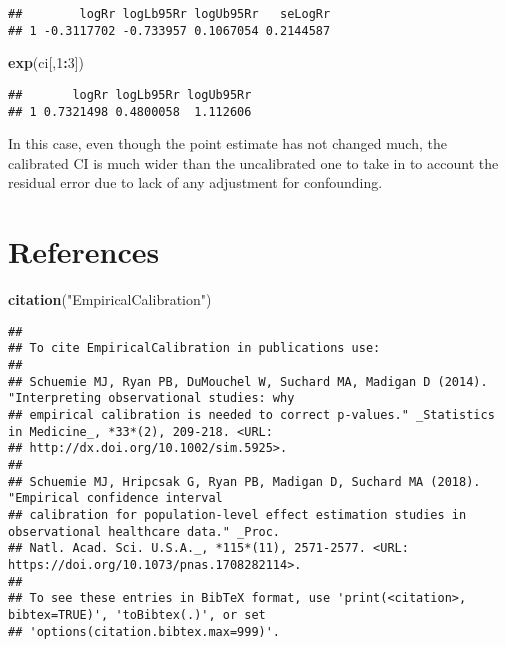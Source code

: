 \documentclass[
]{article}
\newenvironment{Shaded}{\begin{snugshade}}{\end{snugshade}}
\newcommand{\DecValTok}[1]{\textcolor[rgb]{0.00,0.00,0.81}{#1}}
\newcommand{\KeywordTok}[1]{\textcolor[rgb]{0.13,0.29,0.53}{\textbf{#1}}}
\newcommand{\NormalTok}[1]{#1}
\newcommand{\OperatorTok}[1]{\textcolor[rgb]{0.81,0.36,0.00}{\textbf{#1}}}
\newcommand{\StringTok}[1]{\textcolor[rgb]{0.31,0.60,0.02}{#1}}
\begin{document}
\begin{verbatim}
##        logRr logLb95Rr logUb95Rr   seLogRr
## 1 -0.3117702 -0.733957 0.1067054 0.2144587
\end{verbatim}

\begin{Shaded}
\begin{Highlighting}[]
\KeywordTok{exp}\NormalTok{(ci[,}\DecValTok{1}\OperatorTok{:}\DecValTok{3}\NormalTok{])}
\end{Highlighting}
\end{Shaded}

\begin{verbatim}
##       logRr logLb95Rr logUb95Rr
## 1 0.7321498 0.4800058  1.112606
\end{verbatim}

In this case, even though the point estimate has not changed much, the
calibrated CI is much wider than the uncalibrated one to take in to
account the residual error due to lack of any adjustment for
confounding.

\hypertarget{references}{%
\section{References}\label{references}}

\begin{Shaded}
\begin{Highlighting}[]
\KeywordTok{citation}\NormalTok{(}\StringTok{"EmpiricalCalibration"}\NormalTok{)}
\end{Highlighting}
\end{Shaded}

\begin{verbatim}
## 
## To cite EmpiricalCalibration in publications use:
## 
## Schuemie MJ, Ryan PB, DuMouchel W, Suchard MA, Madigan D (2014). "Interpreting observational studies: why
## empirical calibration is needed to correct p-values." _Statistics in Medicine_, *33*(2), 209-218. <URL:
## http://dx.doi.org/10.1002/sim.5925>.
## 
## Schuemie MJ, Hripcsak G, Ryan PB, Madigan D, Suchard MA (2018). "Empirical confidence interval
## calibration for population-level effect estimation studies in observational healthcare data." _Proc.
## Natl. Acad. Sci. U.S.A._, *115*(11), 2571-2577. <URL: https://doi.org/10.1073/pnas.1708282114>.
## 
## To see these entries in BibTeX format, use 'print(<citation>, bibtex=TRUE)', 'toBibtex(.)', or set
## 'options(citation.bibtex.max=999)'.
\end{verbatim}
\end{document}
